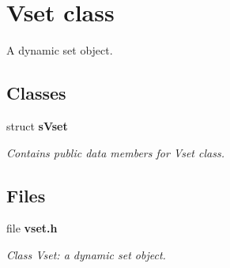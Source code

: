 \section{Vset class}
\label{a00030}


A dynamic set object.  


\subsection*{Classes}
\begin{DoxyCompactItemize}
\item 
struct {\bf sVset}
\begin{DoxyCompactList}\small\item\em Contains public data members for Vset class. \item\end{DoxyCompactList}\end{DoxyCompactItemize}
\subsection*{Files}
\begin{DoxyCompactItemize}
\item 
file {\bf vset.h}


\begin{DoxyCompactList}\small\item\em Class Vset: a dynamic set object. \item\end{DoxyCompactList}

\end{DoxyCompactItemize}
